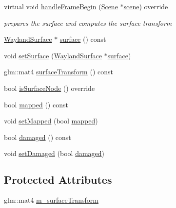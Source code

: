 \begin{DoxyCompactItemize}
virtual void \hyperlink{classmotorcar_1_1WaylandSurfaceNode_a7005bcd9c0944cec3b558344602c783e}{handle\-Frame\-Begin} (\hyperlink{classmotorcar_1_1Scene}{Scene} $\ast$\hyperlink{classmotorcar_1_1SceneGraphNode_aa14e637ed4ae98f77e28941a4b5cfdd8}{scene}) override
\begin{DoxyCompactList}\small\item\em prepares the surface and computes the surface transform \end{DoxyCompactList}\item 
\hyperlink{classmotorcar_1_1WaylandSurface}{Wayland\-Surface} $\ast$ \hyperlink{classmotorcar_1_1WaylandSurfaceNode_a2f888be4621ed73d815ce006246f50ca}{surface} () const 
\item 
void \hyperlink{classmotorcar_1_1WaylandSurfaceNode_ae073a9e9f05bd5d62f09d24f9a86a31a}{set\-Surface} (\hyperlink{classmotorcar_1_1WaylandSurface}{Wayland\-Surface} $\ast$\hyperlink{simple-egl_8c_a0720952aa1caded45b5bcdce589663a9}{surface})
\item 
glm\-::mat4 \hyperlink{classmotorcar_1_1WaylandSurfaceNode_a3910d8ccc764aed402074f21c25a89e8}{surface\-Transform} () const 
\item 
bool \hyperlink{classmotorcar_1_1WaylandSurfaceNode_a35b01820957837d5b3a4625cca82776d}{is\-Surface\-Node} () override
\item 
bool \hyperlink{classmotorcar_1_1WaylandSurfaceNode_a0beab8d65060cff08f645b070a2b1dae}{mapped} () const 
\item 
void \hyperlink{classmotorcar_1_1WaylandSurfaceNode_ac8fa09a02baab4d465a482b5ee361806}{set\-Mapped} (bool \hyperlink{classmotorcar_1_1WaylandSurfaceNode_a0beab8d65060cff08f645b070a2b1dae}{mapped})
\item 
bool \hyperlink{classmotorcar_1_1WaylandSurfaceNode_a49d09e0f0cd3b47c6d67765961da2bf3}{damaged} () const 
\item 
void \hyperlink{classmotorcar_1_1WaylandSurfaceNode_a7acc51a9df01468554691b5e9b681974}{set\-Damaged} (bool \hyperlink{classmotorcar_1_1WaylandSurfaceNode_a49d09e0f0cd3b47c6d67765961da2bf3}{damaged})
\end{DoxyCompactItemize}
\subsection*{Protected Attributes}
\begin{DoxyCompactItemize}
\item 
glm\-::mat4 \hyperlink{classmotorcar_1_1WaylandSurfaceNode_a70da528843079f3bf566086bc4688ad4}{m\-\_\-surface\-Transform}
\end{DoxyCompactItemize}
